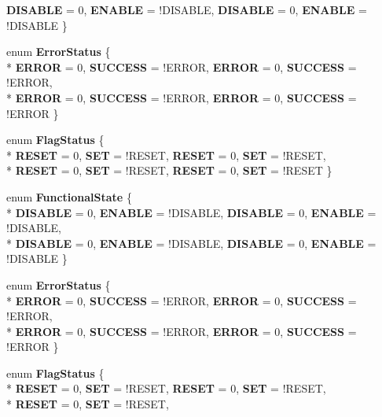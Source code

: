 \begin{DoxyCompactItemize}
{\bfseries D\-I\-S\-A\-B\-L\-E} = 0, 
{\bfseries E\-N\-A\-B\-L\-E} = !\-D\-I\-S\-A\-B\-L\-E, 
{\bfseries D\-I\-S\-A\-B\-L\-E} = 0, 
{\bfseries E\-N\-A\-B\-L\-E} = !\-D\-I\-S\-A\-B\-L\-E
 \}
\item 
enum {\bfseries Error\-Status} \{ \\*
{\bfseries E\-R\-R\-O\-R} = 0, 
{\bfseries S\-U\-C\-C\-E\-S\-S} = !\-E\-R\-R\-O\-R, 
{\bfseries E\-R\-R\-O\-R} = 0, 
{\bfseries S\-U\-C\-C\-E\-S\-S} = !\-E\-R\-R\-O\-R, 
\\*
{\bfseries E\-R\-R\-O\-R} = 0, 
{\bfseries S\-U\-C\-C\-E\-S\-S} = !\-E\-R\-R\-O\-R, 
{\bfseries E\-R\-R\-O\-R} = 0, 
{\bfseries S\-U\-C\-C\-E\-S\-S} = !\-E\-R\-R\-O\-R
 \}
\item 
enum {\bfseries Flag\-Status} \{ \\*
{\bfseries R\-E\-S\-E\-T} = 0, 
{\bfseries S\-E\-T} = !\-R\-E\-S\-E\-T, 
{\bfseries R\-E\-S\-E\-T} = 0, 
{\bfseries S\-E\-T} = !\-R\-E\-S\-E\-T, 
\\*
{\bfseries R\-E\-S\-E\-T} = 0, 
{\bfseries S\-E\-T} = !\-R\-E\-S\-E\-T, 
{\bfseries R\-E\-S\-E\-T} = 0, 
{\bfseries S\-E\-T} = !\-R\-E\-S\-E\-T
 \}
\item 
enum {\bfseries Functional\-State} \{ \\*
{\bfseries D\-I\-S\-A\-B\-L\-E} = 0, 
{\bfseries E\-N\-A\-B\-L\-E} = !\-D\-I\-S\-A\-B\-L\-E, 
{\bfseries D\-I\-S\-A\-B\-L\-E} = 0, 
{\bfseries E\-N\-A\-B\-L\-E} = !\-D\-I\-S\-A\-B\-L\-E, 
\\*
{\bfseries D\-I\-S\-A\-B\-L\-E} = 0, 
{\bfseries E\-N\-A\-B\-L\-E} = !\-D\-I\-S\-A\-B\-L\-E, 
{\bfseries D\-I\-S\-A\-B\-L\-E} = 0, 
{\bfseries E\-N\-A\-B\-L\-E} = !\-D\-I\-S\-A\-B\-L\-E
 \}
\item 
enum {\bfseries Error\-Status} \{ \\*
{\bfseries E\-R\-R\-O\-R} = 0, 
{\bfseries S\-U\-C\-C\-E\-S\-S} = !\-E\-R\-R\-O\-R, 
{\bfseries E\-R\-R\-O\-R} = 0, 
{\bfseries S\-U\-C\-C\-E\-S\-S} = !\-E\-R\-R\-O\-R, 
\\*
{\bfseries E\-R\-R\-O\-R} = 0, 
{\bfseries S\-U\-C\-C\-E\-S\-S} = !\-E\-R\-R\-O\-R, 
{\bfseries E\-R\-R\-O\-R} = 0, 
{\bfseries S\-U\-C\-C\-E\-S\-S} = !\-E\-R\-R\-O\-R
 \}
\item 
enum {\bfseries Flag\-Status} \{ \\*
{\bfseries R\-E\-S\-E\-T} = 0, 
{\bfseries S\-E\-T} = !\-R\-E\-S\-E\-T, 
{\bfseries R\-E\-S\-E\-T} = 0, 
{\bfseries S\-E\-T} = !\-R\-E\-S\-E\-T, 
\\*
{\bfseries R\-E\-S\-E\-T} = 0, 
{\bfseries S\-E\-T} = !\-R\-E\-S\-E\-T, 

\end{DoxyCompactItemize}
